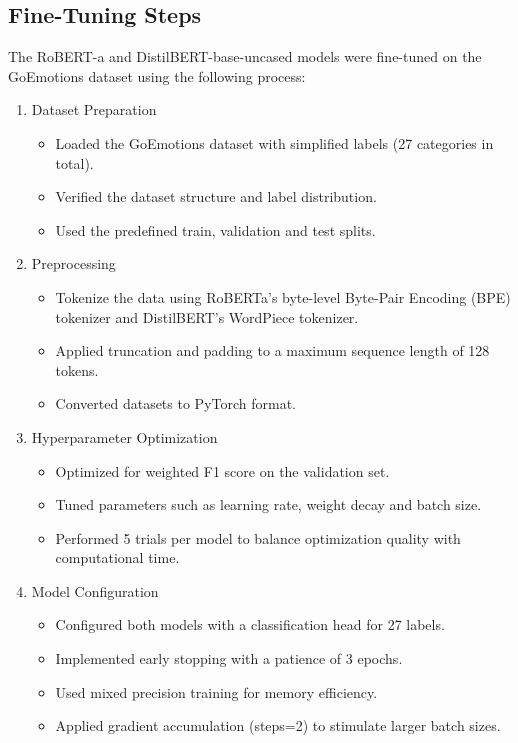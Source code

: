 \documentclass[titlepage]{article}
\begin{document}
\subsection{Fine-Tuning Steps}
The RoBERT-a and DistilBERT-base-uncased models were fine-tuned on the GoEmotions dataset using the following process:
\begin{enumerate}
    \item Dataset Preparation
        \begin{itemize}
            \item Loaded the GoEmotions dataset with simplified labels (27 categories in total).
            \item Verified the dataset structure and label distribution.
            \item Used the predefined train, validation and test splits.
        \end{itemize}
    \item Preprocessing 
        \begin{itemize}
            \item Tokenize the data using RoBERTa's byte-level Byte-Pair Encoding (BPE) tokenizer and DistilBERT's WordPiece tokenizer.
            \item Applied truncation and padding to a maximum sequence length of 128 tokens.
            \item Converted datasets to PyTorch format.
        \end{itemize}
    \item Hyperparameter Optimization
        \begin{itemize}
            \item Optimized for weighted F1 score on the validation set.
            \item Tuned parameters such as learning rate, weight decay and batch size.
            \item Performed 5 trials per model to balance optimization quality with computational time.
        \end{itemize}
    \item Model Configuration 
        \begin{itemize}
            \item Configured both models with a classification head for 27 labels.
            \item Implemented early stopping with a patience of 3 epochs.
            \item Used mixed precision training for memory efficiency.
            \item Applied gradient accumulation (steps=2) to stimulate larger batch sizes.

\end{itemize}
\end{enumerate}
\end{document}
